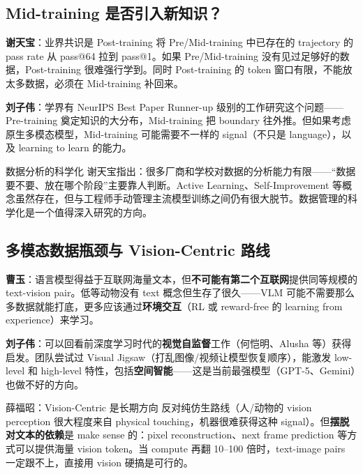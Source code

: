 \documentclass[a4paper]{article}
\begin{document}
\subsection{Mid-training 是否引入新知识？}

\textbf{谢天宝}：业界共识是 Post-training 将 Pre/Mid-training 中已存在的 trajectory 的 pass rate 从 pass@64 拉到 pass@1。如果 Pre/Mid-training 没有见过足够好的数据，Post-training 很难强行学到。同时 Post-training 的 token 窗口有限，不能放太多数据，必须在 Mid-training 补回来。

\textbf{刘子伟}：学界有 NeurIPS Best Paper Runner-up 级别的工作研究这个问题——Pre-training 奠定知识的大分布，Mid-training 把 boundary 往外推。但如果考虑原生多模态模型，Mid-training 可能需要不一样的 signal（不只是 language），以及 learning to learn 的能力。

\begin{knowledgebox}{数据分析的科学化}
谢天宝指出：很多厂商和学校对数据的分析能力有限——``数据要不要、放在哪个阶段''主要靠人判断。Active Learning、Self-Improvement 等概念虽然存在，但与工程师手动管理主流模型训练之间仍有很大脱节。数据管理的科学化是一个值得深入研究的方向。
\end{knowledgebox}

\subsection{多模态数据瓶颈与 Vision-Centric 路线}

\textbf{曹玉}：语言模型得益于互联网海量文本，但\textbf{不可能有第二个互联网}提供同等规模的 text-vision pair。低等动物没有 text 概念但生存了很久——VLM 可能不需要那么多数据就能打底，更多应该通过\textbf{环境交互}（RL 或 reward-free 的 learning from experience）来学习。

\textbf{刘子伟}：可以回看前深度学习时代的\textbf{视觉自监督}工作（何恺明、Alusha 等）获得启发。团队尝试过 Visual Jigsaw（打乱图像/视频让模型恢复顺序），能激发 low-level 和 high-level 特性，包括\textbf{空间智能}——这是当前最强模型（GPT-5、Gemini）也做不好的方向。

\begin{importantbox}{薛福昭：Vision-Centric 是长期方向}
反对纯仿生路线（人/动物的 vision perception 很大程度来自 physical touching，机器很难获得这种 signal）。但\textbf{摆脱对文本的依赖}是 make sense 的：pixel reconstruction、next frame prediction 等方式可以提供海量 vision token。当 compute 再翻 10--100 倍时，text-image pairs 一定跟不上，直接用 vision 硬搞是可行的。
\end{importantbox}
\end{document}

